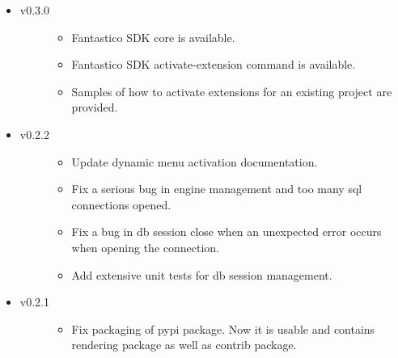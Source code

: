 \documentclass[letterpaper,10pt,english]{sphinxmanual}
\begin{document}
\begin{itemize}
\begin{description}
\begin{itemize}
\end{itemize}

\end{description}

\item {} \begin{description}
\item[{v0.3.0}] \leavevmode\begin{itemize}
\item {} 
Fantastico SDK core is available.

\item {} 
Fantastico SDK activate-extension command is available.

\item {} 
Samples of how to activate extensions for an existing project are provided.

\end{itemize}

\end{description}

\item {} \begin{description}
\item[{v0.2.2}] \leavevmode\begin{itemize}
\item {} 
Update dynamic menu activation documentation.

\item {} 
Fix a serious bug in engine management and too many sql connections opened.

\item {} 
Fix a bug in db session close when an unexpected error occurs when opening the connection.

\item {} 
Add extensive unit tests for db session management.

\end{itemize}

\end{description}

\item {} \begin{description}
\item[{v0.2.1}] \leavevmode\begin{itemize}
\item {} 
Fix packaging of pypi package. Now it is usable and contains rendering package as well as contrib package.

\end{itemize}


\end{description}
\end{itemize}
\end{document}
